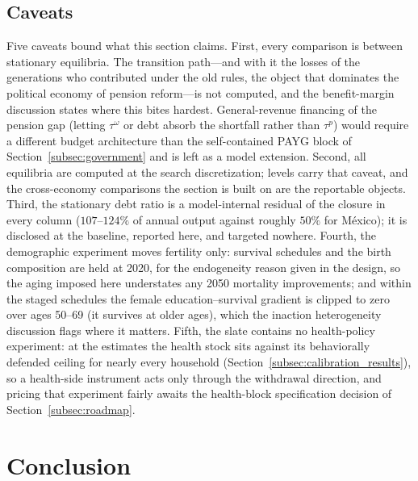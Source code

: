 \documentclass[12pt,a4paper]{article}
\begin{document}
\subsection{Caveats}
\label{subsec:exp_caveats}

Five caveats bound what this section claims. First, every comparison is between stationary equilibria. The transition path---and with it the losses of the generations who contributed under the old rules, the object that dominates the political economy of pension reform---is not computed, and the benefit-margin discussion states where this bites hardest. General-revenue financing of the pension gap (letting $\tau^\omega$ or debt absorb the shortfall rather than $\tau^p$) would require a different budget architecture than the self-contained PAYG block of Section~\ref{subsec:government} and is left as a model extension. Second, all equilibria are computed at the search discretization; levels carry that caveat, and the cross-economy comparisons the section is built on are the reportable objects. Third, the stationary debt ratio is a model-internal residual of the closure in every column ($107$--$124\%$ of annual output against roughly $50\%$ for M\'exico); it is disclosed at the baseline, reported here, and targeted nowhere. Fourth, the demographic experiment moves fertility only: survival schedules and the birth composition are held at 2020, for the endogeneity reason given in the design, so the aging imposed here understates any 2050 mortality improvements; and within the staged schedules the female education--survival gradient is clipped to zero over ages 50--69 (it survives at older ages), which the inaction heterogeneity discussion flags where it matters. Fifth, the slate contains no health-policy experiment: at the estimates the health stock sits against its behaviorally defended ceiling for nearly every household (Section~\ref{subsec:calibration_results}), so a health-side instrument acts only through the withdrawal direction, and pricing that experiment fairly awaits the health-block specification decision of Section~\ref{subsec:roadmap}.




\section{Conclusion}
\label{sec:conclusion}
\end{document}
